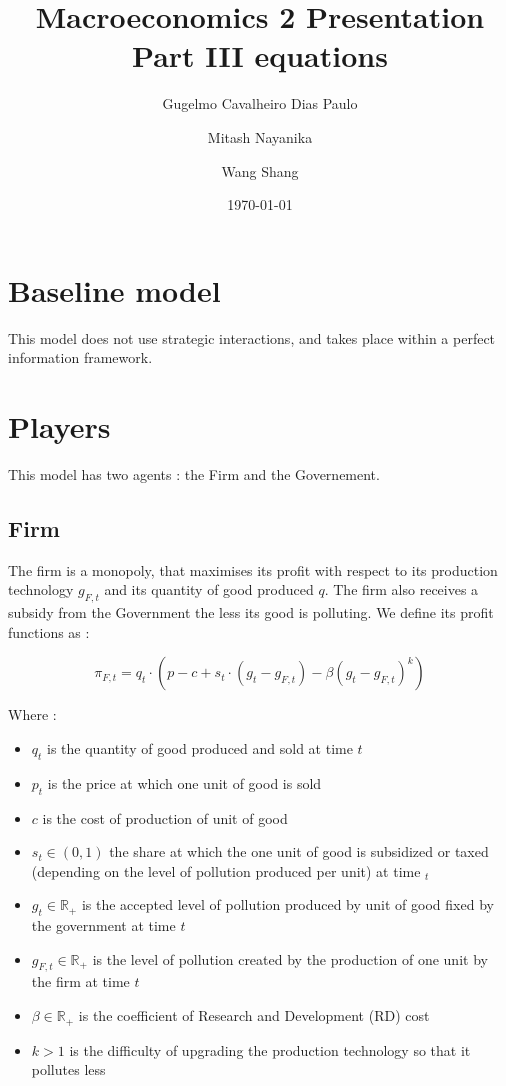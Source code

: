 \documentclass{article}
\title{Macroeconomics 2 Presentation \\ Part III equations}
\author{Gugelmo Cavalheiro Dias Paulo \\ \and Mitash Nayanika \\ \and Wang Shang}
\date{\today}
\begin{document}
\section{Baseline model}

This model does not use strategic interactions, and takes place within a perfect information framework. 

\section{Players}

This model has two agents : the Firm and the Governement. 

\subsection{Firm}

The firm is a monopoly, that maximises its profit with respect to its production technology $g_{F,t}$ and its quantity of good produced $q$. The firm also receives a subsidy from the Government the less its good is polluting. We define its profit functions as : 

\begin{equation}
    \pi_{F,t}=q_{t}\cdot\left(p-c+s_{t}\cdot(g_{t}-g_{F,t})-\beta(g_{t}-g_{F,t})^{k}\right)
\end{equation}

Where : 
\begin{itemize}
    \item $q_{t}$ is the quantity of good produced and sold at time $t$
    \item $p_{t}$ is the price at which one unit of good is sold
    \item $c$ is the cost of production of unit of good
    \item $s_{t}\in\left(0,1\right)$ the share at which the one unit of good is subsidized or taxed (depending on the level of pollution produced per unit) at time $_{t}$
    \item $g_{t}\in\mathbb{R}_{+}$ is the accepted level of pollution produced by unit of good fixed by the government at time $t$
    \item $g_{F,t}\in\mathbb{R}_{+}$ is the level of pollution created by the production of one unit by the firm at time $t$
    \item $\beta\in\mathbb{R}_{+}$ is the coefficient of Research and Development (RD) cost
    \item $k>1$ is the difficulty of upgrading the production technology so that it pollutes less
\end{itemize}
\end{document}
